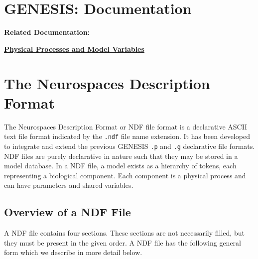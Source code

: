 \documentclass[12pt]{article}
\begin{document}
\section*{GENESIS: Documentation}

{\bf Related Documentation:}

\href{../model-variables/model-variables.tex}{\bf Physical Processes and Model Variables}


\section*{The Neurospaces Description Format}

The Neurospaces Description Format or NDF file format is a declarative ASCII text file format indicated by the {\tt .ndf} file name extension. It has been developed to integrate and extend the previous GENESIS {\tt .p} and {\tt .g} declarative file formats. NDF files are purely declarative in nature such that they may be stored in a model database. In a NDF file, a model exists as a hierarchy of tokens, each representing a biological component. Each component is a physical process and can have parameters and shared variables. 

\subsection*{Overview of a NDF File}
\label{sec:overview-ndf-file}
A NDF file contains four sections. These sections are not necessarily
filled, but they must be present in the given order.  A NDF file has
the following general form which we describe in more detail below.
\end{document}
